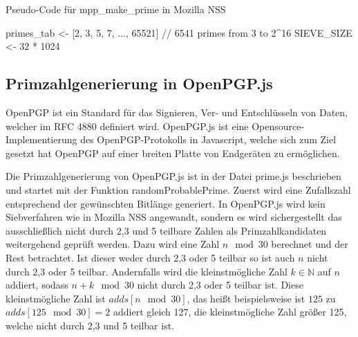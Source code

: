 \begin{algorithm}[h]
\DontPrintSemicolon
\caption{Pseudo-Code für mpp_make_prime in Mozilla NSS}
\label{alg:makePrimeGenerationNSS}
primes_tab <- [2, 3, 5, 7, ..., 65521] // 6541 primes from 3 to 2^16\;
SIEVE_SIZE <- 32 * 1024\;

\end{algorithm}

\subsection{Primzahlgenerierung in OpenPGP.js}

OpenPGP ist ein Standard für das Signieren, Ver- und Entschlüsseln von Daten, welcher im RFC 4880 \cite{rfc4880} definiert wird.
OpenPGP.js \cite{OpenPGPjs} ist eine Opensource-Implementierung des OpenPGP-Protokolls in Javascript, welche sich zum Ziel gesetzt hat OpenPGP auf einer breiten Platte von Endgeräten zu ermöglichen.

Die Primzahlgenerierung von OpenPGP.js ist in der Datei prime.js beschrieben und startet mit der Funktion randomProbablePrime.
Zuerst wird eine Zufallszahl entsprechend der gewünschten Bitlänge generiert.
In OpenPGP.js wird kein Siebverfahren wie in Mozilla NSS angewandt, sondern es wird sichergestellt das ausschließlich nicht durch 2,3 und 5 teilbare Zahlen als Primzahlkandidaten weitergehend geprüft werden.
Dazu wird eine Zahl $n \mod 30$ berechnet und der Rest betrachtet.
Ist dieser weder durch 2,3 oder 5 teilbar so ist auch $n$ nicht durch 2,3 oder 5 teilbar.
Andernfalls wird die kleinstmögliche Zahl $k \in \mathbb{N}$ auf $n$ addiert, sodass $n + k \mod 30$ nicht durch 2,3 oder 5 teilbar ist.
Diese kleinstmögliche Zahl ist $adds[n \mod 30]$, das heißt beispielsweise ist $125$ zu $adds[125 \mod 30] = 2$ addiert gleich 127, die kleinstmögliche Zahl größer 125, welche nicht durch 2,3 und 5 teilbar ist.

